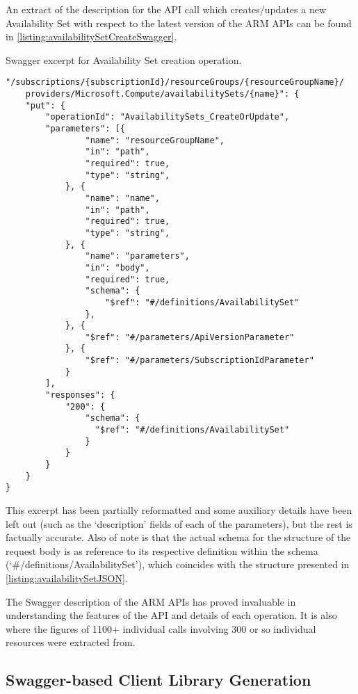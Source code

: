 \documentclass[11pt]{report}
\begin{document}
An extract of the description for the API call which creates/updates a new
Availability Set with respect to the latest version of the ARM APIs can be
found in \autoref{listing:availabilitySetCreateSwagger}.

\begin{listing}[H]
\caption{Swagger excerpt for Availability Set creation operation.}
\label{listing:availabilitySetCreateSwagger}
\begin{verbatim}
"/subscriptions/{subscriptionId}/resourceGroups/{resourceGroupName}/
    providers/Microsoft.Compute/availabilitySets/{name}": {
    "put": {
        "operationId": "AvailabilitySets_CreateOrUpdate",
        "parameters": [{
                "name": "resourceGroupName",
                "in": "path",
                "required": true,
                "type": "string",
            }, {
                "name": "name",
                "in": "path",
                "required": true,
                "type": "string",
            }, {
                "name": "parameters",
                "in": "body",
                "required": true,
                "schema": {
                    "$ref": "#/definitions/AvailabilitySet"
                },
            }, {
                "$ref": "#/parameters/ApiVersionParameter"
            }, {
                "$ref": "#/parameters/SubscriptionIdParameter"
            }
        ],
        "responses": {
            "200": {
                "schema": {
                  "$ref": "#/definitions/AvailabilitySet"
                }
            }
        }
    }
}
\end{verbatim}
\end{listing}

This excerpt has been partially reformatted and some auxiliary details
have been left out (such as the `description' fields of each of the
parameters), but the rest is factually accurate. Also of note is that the
actual schema for the structure of the request body is as reference to
its respective definition within the schema (`\#/definitions/AvailabilitySet'),
which coincides with the structure presented in \autoref{listing:availabilitySetJSON}.


The Swagger description of the ARM APIs has proved invaluable in understanding
the features of the API and details of each operation. It is also where the
figures of 1100+ individual calls involving 300 or so individual resources were
extracted from.

\subsection{Swagger-based Client Library Generation}
\end{document}
